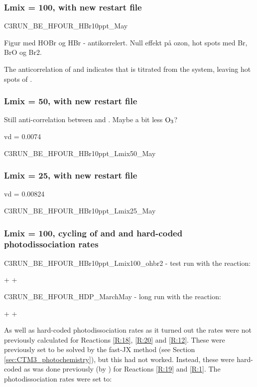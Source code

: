 \subsubsection{Lmix = 100, with new restart file}

C3RUN\_BE\_HFOUR\_HBr10ppt\_May

Figur med HOBr og HBr - antikorrelert. Null effekt på ozon, hot spots med Br, BrO og Br2. 

The anticorrelation of  and  indicates that  is titrated from the system, leaving hot spots of . 

\subsubsection{Lmix = 50, with new restart file}

Still anti-correlation between  and . Maybe a bit less $\mathrm{O_3}$? 

vd = 0.0074 

C3RUN\_BE\_HFOUR\_HBr10ppt\_Lmix50\_May

\subsubsection{Lmix = 25, with new restart file}

vd = 0.00824

C3RUN\_BE\_HFOUR\_HBr10ppt\_Lmix25\_May


\subsubsection{Lmix = 100, cycling of  and  and hard-coded photodissociation rates}

C3RUN\_BE\_HFOUR\_HBr10ppt\_Lmix100\_ohbr2 - test run with the reaction: 

\begin{reaction}
     +  \rightarrow {} + 
    \label{rqn:oh_br2}
\end{reaction}

C3RUN\_BE\_HFOUR\_HDP\_MarchMay - long run with the reaction: 

\begin{reaction}
     +  \rightarrow {} + 
    \label{rqn:oh_hbr}
\end{reaction}

As well as hard-coded photodissociation rates as it turned out the rates were not previously calculated for Reactions \ref{R:18}, \ref{R:20} and \ref{R:12}. These were previously set to be solved by the fast-JX method (see Section \ref{sec:CTM3_photochemistry}), but this had not worked. Instead, these were hard-coded as was done previously (by \cite{Susanne}) for Reactions \ref{R:19} and \ref{R:1}. The photodissociation rates were set to: 

